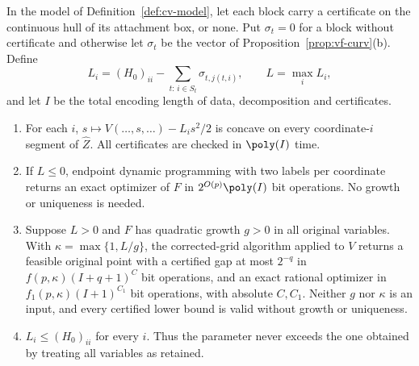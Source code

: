 \begin{theorem}\label{thm:cv}
In the model of Definition~\ref{def:cv-model}, let each block carry a
certificate on the continuous hull of its attachment box, or none. Put
$\sigma_t=0$ for a block without certificate and otherwise let $\sigma_t$ be
the vector of Proposition~\ref{prop:vf-curv}(b). Define
\begin{equation}\label{eq:cv-L}
L_i=(H_0)_{ii}-\sum_{t:\,i\in S_t}\sigma_{t,j(t,i)},\qquad L=\max_iL_i,
\end{equation}
and let $I$ be the total encoding length of data, decomposition and
certificates.
\begin{enumerate}
\item[(i)] For each $i$, $s\mapsto V(\ldots,s,\ldots)-L_is^2/2$ is concave on
every coordinate-$i$ segment of $\widehat Z$. All certificates are checked in
$\poly(I)$ time.
\item[(ii)] If $L\le0$, endpoint dynamic programming with two labels per
coordinate returns an exact optimizer of $F$ in $2^{O(p)}\poly(I)$ bit
operations. No growth or uniqueness is needed.
\item[(iii)] Suppose $L>0$ and $F$ has quadratic growth $g>0$ in all original
variables. With $\kappa=\max\{1,L/g\}$, the corrected-grid algorithm applied to
$V$ returns a feasible original point with a certified gap at most $2^{-q}$ in
$f(p,\kappa)(I+q+1)^C$ bit operations, and an exact rational optimizer in
$f_1(p,\kappa)(I+1)^{C_1}$ bit operations, with absolute $C,C_1$. Neither $g$
nor $\kappa$ is an input, and every certified lower bound is valid without
growth or uniqueness.
\item[(iv)] $L_i\le(H_0)_{ii}$ for every $i$. Thus the parameter never exceeds
the one obtained by treating all variables as retained.
\end{enumerate}
\end{theorem}

